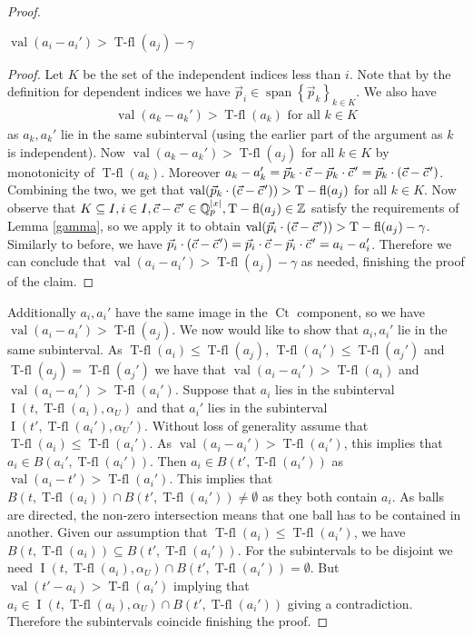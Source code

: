 \documentclass{amsart}
\newcommand{\curly}[1]{\left\{#1\right\}}
\DeclareMathOperator{\Ct}{Ct}
\DeclareMathOperator{\vecspan}{span}
\DeclareMathOperator{\val}{val}
\DeclareMathOperator{\vval}{val}
\DeclareMathOperator{\tfl}{T-fl}
\DeclareMathOperator{\inti}{I}
\begin{document}
\begin{proof}
  \begin{Claim}
    $\val(a_i - a_i') > \tfl(a_j) - \gamma$
  \end{Claim}
  \begin{proof}
    Let $K$ be the set of the independent indices less than $i$.
    Note that by the definition for dependent indices we have $\vec p_i \in \vecspan \curly{\vec p_k}_{k \in K}$.
    We also have 
    \begin{align*}
      \val(a_k - a_k') > \tfl(a_k) \text { for all } k \in K
    \end{align*}
    as $a_k, a_k'$ lie in the same subinterval (using the earlier part of the argument as $k$ is independent).
    Now $\val(a_k - a_k') > \tfl(a_j)$  for all $k \in K$ by monotonicity of $\tfl(a_k)$.
    Moreover $a_k - a_k' = \vec p_k \cdot \vec c - \vec p_k \cdot \pvec c' = \vec p_k \cdot (\vec c - \pvec {c}')$.
    Combining the two, we get that $\val(\vec p_k \cdot (\vec c - \pvec {c}')) > \tfl(a_j)$ for all $k \in K$.
    Now observe that $K \subseteq I, i \in I, \vec c - \pvec {c}' \in \Q_p^{|x|}, \tfl(a_j) \in \Z$
    satisfy the requirements of Lemma \ref {gamma}, so we apply it to obtain
    $\val(\vec p_i \cdot (\vec c - \pvec {c}')) > \tfl(a_j) - \gamma$.
    Similarly to before, we have $\vec p_i \cdot (\vec c - \pvec {c}') = \vec p_i \cdot \vec c - \vec p_i \cdot \pvec {c}' = a_i - a_i'$.
    Therefore we can conclude that $\val(a_i - a_i') > \tfl(a_j) - \gamma$
    as needed, finishing the proof of the claim.
  \end{proof}	
  Additionally $a_i, a_i'$ have the same image in the $\Ct$ component, so we have $\val(a_i - a_i') > \tfl(a_j)$.
  We now would like to show that $a_i, a_i'$ lie in the same subinterval.
  As $\tfl(a_i) \leq \tfl(a_j)$, $\tfl(a_i') \leq \tfl(a_j')$ and $\tfl(a_j) = \tfl(a_j')$ we have that
  $\val(a_i - a_i') > \tfl(a_i)$ and $\val(a_i - a_i') > \tfl(a_i')$.
  Suppose that $a_i$ lies in the subinterval $\inti(t, \tfl(a_i), \alpha_U)$
  and that $a_i'$ lies in the subinterval $\inti(t', \tfl(a_i'), \alpha_U')$.
  Without loss of generality assume that $\tfl(a_i) \leq \tfl(a_i')$.
  As $\val(a_i - a_i') > \tfl(a_i')$, this implies that $a_i \in B(a_i', \tfl(a_i'))$.
  Then $a_i \in B(t', \tfl(a_i'))$ as $\vval(a_i - t') > \tfl(a_i')$.
  This implies that $B(t, \tfl(a_i)) \cap B(t', \tfl(a_i')) \neq \emptyset$ as they both contain $a_i$.
  As balls are directed, the non-zero intersection means that one ball has to be contained in another.
  Given our assumption that $\tfl(a_i) \leq \tfl(a_i')$, we have $B(t, \tfl(a_i)) \subseteq B(t', \tfl(a_i'))$.
  For the subintervals to be disjoint we need 
  $\inti(t, \tfl(a_i), \alpha_U) \cap B(t', \tfl(a_i')) = \emptyset$.
  But $\val(t' - a_i) > \tfl(a_i')$ implying that $a_i \in \inti(t, \tfl(a_i), \alpha_U) \cap B(t', \tfl(a_i'))$ giving a contradiction.
  Therefore the subintervals coincide finishing the proof.
\end{proof}
\end{document}
